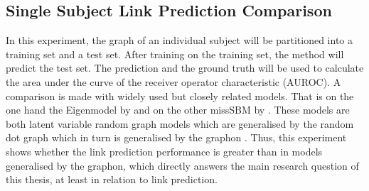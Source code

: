 \documentclass[11pt]{report} %
\begin{document}
\subsection{Single Subject Link Prediction Comparison} \label{singlelinkpredictionexperiment}
In this experiment, the graph of an individual subject will be partitioned into a training set and a test set. 
After training on the training set, the method will predict the test set. 
The prediction and the ground truth will be used to calculate the area under the curve of the receiver operator characteristic (AUROC). 
A comparison is made with widely used but closely related models. That is on the one hand the Eigenmodel by  and on the other missSBM by . 
These models are both latent variable random graph models which are generalised by the random dot graph \cite{matias2014} which in turn is generalised by the graphon \cite{Medina2020}. 
Thus, this experiment shows whether the link prediction performance is greater than in models generalised by the graphon, which directly answers the main research question of this thesis, at least in relation to link prediction. 
\end{document}
